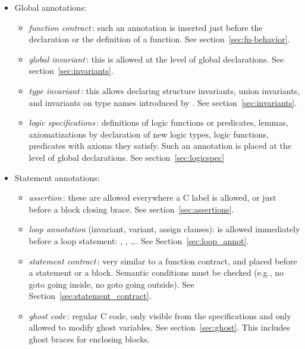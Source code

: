 \begin{itemize}
\item Global annotations:
  \begin{itemize}
  \item \emph{function contract}\,: such an annotation is inserted just before
    the declaration or the definition of a function.
    See section~\ref{sec:fn-behavior}.

  \item \emph{global invariant}\,: this is allowed at the level of
    global declarations. See section~\ref{sec:invariants}.

  \item \emph{type invariant}\,: this allows declaring  structure invariants,
     union invariants, 
     and invariants on type names introduced by
    \typedef.  See section~\ref{sec:invariants}.

  \item \emph{logic specifications}\,: definitions of logic functions
    or predicates, lemmas, axiomatizations by declaration of new logic
    types, logic functions, predicates with axioms they satisfy. Such an
    annotation is placed at the level of global declarations. 
    See section~\ref{sec:logicspec}

  \end{itemize}

\item Statement annotations:
  \begin{itemize}
  \item \emph{assertion}\,: these are allowed
    everywhere a C label is allowed, or just before a
    block closing brace. See section~\ref{sec:assertions}.

  \item \emph{loop annotation} (invariant, variant, assign clauses): is
    allowed immediately before a loop statement: \For, \While,
    \Do\ldots \While. See Section~\ref{sec:loop_annot}.

  \item \emph{statement contract}\,: very similar to a function contract, and
    placed before a statement or a block.  Semantic conditions must
    be checked (e.g., no goto going inside, no goto
    going outside).  See Section~\ref{sec:statement_contract}.

  \item \emph{ghost code}\,: regular C code, only visible from the
    specifications and only allowed to modify ghost
    variables. See section~\ref{sec:ghost}. This includes ghost braces
    for enclosing blocks.

  \end{itemize}

\end{itemize}

